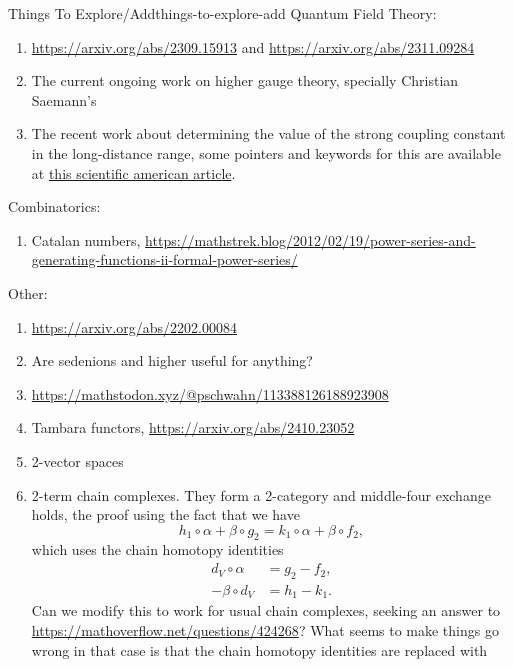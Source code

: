 \begin{remark}{Things To Explore/Add}{things-to-explore-add}
    Quantum Field Theory:
    \begin{enumerate}
        \item \url{https://arxiv.org/abs/2309.15913} and \url{https://arxiv.org/abs/2311.09284}
        \item The current ongoing work on higher gauge theory, specially Christian Saemann's
        \item The recent work about determining the value of the strong coupling constant in the long-distance range, some pointers and keywords for this are available at \href{https://www.scientificamerican.com/article/physicists-finally-know-how-the-strong-force-gets-its-strength/}{this scientific american article}.
    \end{enumerate}
    Combinatorics:
    \begin{enumerate}
        \item Catalan numbers, \url{https://mathstrek.blog/2012/02/19/power-series-and-generating-functions-ii-formal-power-series/}
    \end{enumerate}
    Other:
    \begin{enumerate}
        \item \url{https://arxiv.org/abs/2202.00084}
        \item Are sedenions and higher useful for anything?
        \item \url{https://mathstodon.xyz/@pschwahn/113388126188923908}
        \item Tambara functors, \url{https://arxiv.org/abs/2410.23052}
        \item 2-vector spaces
        \item 2-term chain complexes. They form a 2-category and middle-four exchange holds, the proof using the fact that we have
            \[
                h_{1}\circ\alpha+\beta\circ g_{2}%
                =%
                k_{1}\circ\alpha+\beta\circ f_{2},%
            \]%
            which uses the chain homotopy identities
            \begin{align*}
                d_{V}\circ\alpha  &= g_{2}-f_{2},\\
                -\beta\circ d_{V} &= h_{1}-k_{1}.
            \end{align*}
            Can we modify this to work for usual chain complexes, seeking an answer to \url{https://mathoverflow.net/questions/424268}? What seems to make things go wrong in that case is that the chain homotopy identities are replaced with
            \begin{align*}

\end{align*}
\end{enumerate}
\end{remark}

